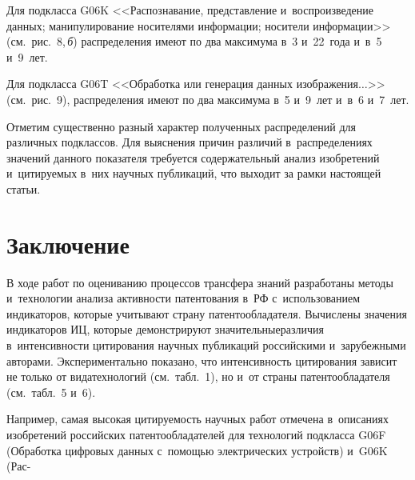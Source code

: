 \begin{multicols}{2}
     Для подкласса G06K <<Распознавание, пред\-став\-ле\-ние и~воспроизведение 
данных; манипулирование носителями информации; носители 
информации>> (см.\ рис.~8,\,\textit{б}) распределения имеют по два максимума в~3 и~22~года 
и~в~5 и~9~лет.



     
     Для подкласса G06T <<Обработка или генерация данных 
изображения$\ldots$>> (см.\ рис.~9), распределения имеют по два максимума в~5 
и~9~лет и~в~6 и~7~лет.
     
     Отметим существенно разный характер полученных распределений для 
различных подклассов. Для выяснения причин различий в~распределениях 
значений данного показателя требуется содержательный анализ изобретений 
и~цитируемых в~них научных публикаций, что выходит за рамки настоящей 
статьи.
     
\section{Заключение}

     
     В ходе работ по оцениванию процессов трансфера знаний разработаны 
методы и~технологии анализа активности патентования в~РФ с~использованием 
индикаторов, которые учитывают страну патентообладателя. Вычислены 
значения индикаторов ИЦ, которые демонстрируют значительные\linebreak различия 
в~интенсивности цитирования научных публикаций российскими и~зарубежными 
авторами. Экспериментально показано, что интенсивность цитирования зависит 
не только от вида\linebreak технологий (см.\ табл.~1), но и~от страны патентообладателя 
(см.\ табл.~5 и~6).
     
     Например, самая высокая цитируемость научных работ отмечена 
в~описаниях изобретений российских патентообладателей для технологий 
подкласса G06F (Обработка цифровых данных \mbox{с~помощью} электрических 
устройств) и~G06K (Рас-\linebreak\vspace*{-12pt}

\pagebreak

\end{multicols}

\begin{figure*} %
\vspace*{1pt}
 \begin{center}
 \mbox{%
 \epsfxsize=147.489mm
 }
 \end{center}
 \vspace*{-9pt}
\vspace*{2pt}
     \end{figure*}

